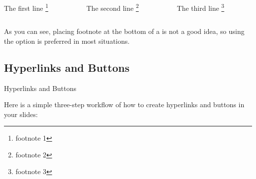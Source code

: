 \begin{fragileframe}

\begin{latexexample}
\begin{columns}[c,totalwidth=0.9\textwidth]
  \begin{column}{0.3\textwidth}
    The first line \footnote[frame,1]{footnote 1}
  \end{column}
  \begin{column}{0.3\textwidth}
    The second line \footnote[frame,2]{footnote 2}
  \end{column}
  \begin{column}{0.3\textwidth}
    The third line \footnote[3]{footnote 3}
  \end{column}
\end{columns} 
\end{latexexample}

As you can see, placing footnote at the bottom of a  is not a good idea, so using the  option is preferred in most situations.

\end{fragileframe}

\subsection{Hyperlinks and Buttons}

\begin{fragileframe}{Hyperlinks and Buttons}

Here is a simple three-step workflow of how to create hyperlinks and buttons in your slides: \medskip


\end{fragileframe}


